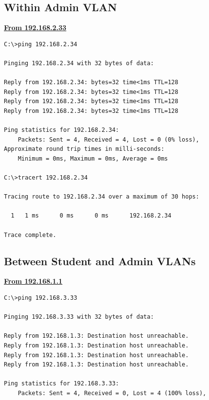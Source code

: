 \documentclass{article}
\begin{document}
\subsection{Within Admin VLAN}
\textbf{\underline{From 192.168.2.33}}\\
\begin{lstlisting}[language=CISCO]
C:\>ping 192.168.2.34

Pinging 192.168.2.34 with 32 bytes of data:

Reply from 192.168.2.34: bytes=32 time<1ms TTL=128
Reply from 192.168.2.34: bytes=32 time<1ms TTL=128
Reply from 192.168.2.34: bytes=32 time<1ms TTL=128
Reply from 192.168.2.34: bytes=32 time<1ms TTL=128

Ping statistics for 192.168.2.34:
    Packets: Sent = 4, Received = 4, Lost = 0 (0% loss),
Approximate round trip times in milli-seconds:
    Minimum = 0ms, Maximum = 0ms, Average = 0ms

C:\>tracert 192.168.2.34

Tracing route to 192.168.2.34 over a maximum of 30 hops: 

  1   1 ms      0 ms      0 ms      192.168.2.34

Trace complete.
\end{lstlisting}


\subsection{Between Student and Admin VLANs}
\textbf{\underline{From 192.168.1.1}}\\
\begin{lstlisting}[language=CISCO]
C:\>ping 192.168.3.33

Pinging 192.168.3.33 with 32 bytes of data:

Reply from 192.168.1.3: Destination host unreachable.
Reply from 192.168.1.3: Destination host unreachable.
Reply from 192.168.1.3: Destination host unreachable.
Reply from 192.168.1.3: Destination host unreachable.

Ping statistics for 192.168.3.33:
    Packets: Sent = 4, Received = 0, Lost = 4 (100% loss),
\end{lstlisting}
\end{document}
